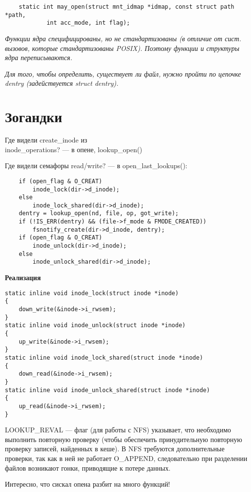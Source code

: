 \begin{lstlisting}
    static int may_open(struct mnt_idmap *idmap, const struct path *path,
		    int acc_mode, int flag);
\end{lstlisting}

\textit{
Функции ядра специфицированы, но не стандартизованы (в отличие от сист. вызовов, которые стандартизованы POSIX). Поэтому функции и структуры ядра переписываются.}

\textit{
Для того, чтобы определить, существует ли файл, нужно пройти по цепочке dentry (задействуется struct dentry).}

\section*{Зогандки}

Где видели create\_inode из \\ inode\_operations? --- в опене, lookup\_open()

Где видели семафоры read/write? --- в open\_last\_lookups():

\begin{lstlisting}
	if (open_flag & O_CREAT)
		inode_lock(dir->d_inode);
	else
		inode_lock_shared(dir->d_inode);
	dentry = lookup_open(nd, file, op, got_write);
	if (!IS_ERR(dentry) && (file->f_mode & FMODE_CREATED))
		fsnotify_create(dir->d_inode, dentry);
	if (open_flag & O_CREAT)
		inode_unlock(dir->d_inode);
	else
		inode_unlock_shared(dir->d_inode);
\end{lstlisting}

\textbf{Реализация}

\begin{lstlisting}
static inline void inode_lock(struct inode *inode)
{
	down_write(&inode->i_rwsem);
}
static inline void inode_unlock(struct inode *inode)
{
	up_write(&inode->i_rwsem);
}
static inline void inode_lock_shared(struct inode *inode)
{
	down_read(&inode->i_rwsem);
}
static inline void inode_unlock_shared(struct inode *inode)
{
	up_read(&inode->i_rwsem);
}
\end{lstlisting}

LOOKUP\_REVAL --- флаг (для работы с NFS) указывает, что необходимо выполнить повторную проверку (чтобы обеспечить принудительную повторную проверку записей, найденных в кеше). В NFS требуются дополнительные проверки, так как в ней не работает O\_APPEND, следовательно при разделении файлов возникают гонки, приводящие к потере данных.

Интересно, что сискал опена разбит на много функций!

